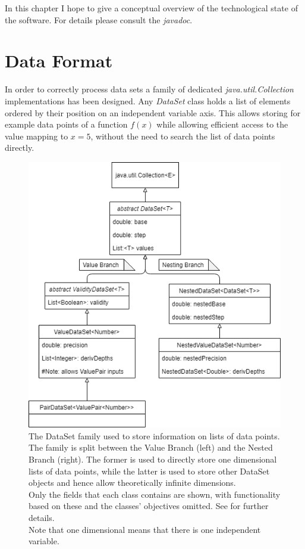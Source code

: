 \documentclass[main.tex]{subfiles}
\begin{document}
  
  In this chapter I hope to give a conceptual overview of the technological state of the software. For details please consult the \textit{javadoc}.
  
  \section{Data Format}
    \label{sec:impl:data}
    
    In order to correctly process data sets a family of dedicated \textit{java.util.Collection} implementations has been designed. Any \textit{DataSet} class holds a list of elements ordered by their position on an independent variable axis. This allows storing for example data points of a function $f(x)$ while allowing efficient access to the value mapping to $x=5$, without the need to search the list of data points directly.
    
    \begin{figure}
      \centering
      \includegraphics[width=0.55\linewidth]{figures/dataSetFamily}
      \captionsetup{format=plain, indention=1.0cm}
      \caption{The DataSet family used to store information on lists of data points. The family is split between the Value Branch (left) and the Nested Branch (right). The former is used to directly store one dimensional lists of data points, while the latter is used to store other DataSet objects and hence allow theoretically infinite dimensions. \\
      Only the fields that each class contains are shown, with functionality based on these and the classes' objectives omitted. See  for further details. \\
      Note that one dimensional means that there is one independent variable.}
      \label{fig:dataSetFam}
    \end{figure}
    
\end{document}
